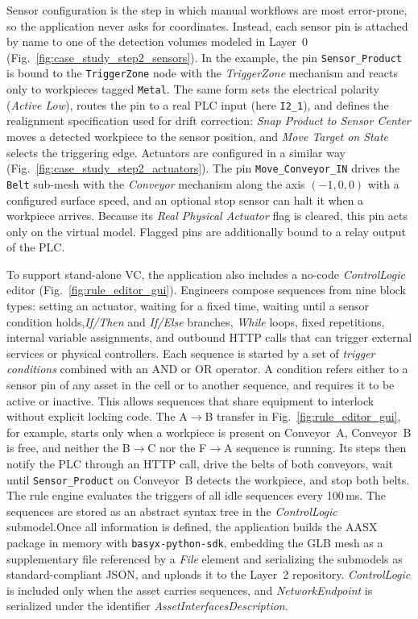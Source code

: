 \documentclass{ieeeojies}
\begin{document}
Sensor configuration is the step in which manual workflows are most error-prone, so the application never asks for coordinates. Instead, each sensor pin is attached by name to one of the detection volumes modeled in Layer~0 (Fig.~\ref{fig:case_study_step2_sensors}). In the example, the pin \texttt{Sensor\_Product} is bound to the \texttt{TriggerZone} node with the \textit{TriggerZone} mechanism and reacts only to workpieces tagged \texttt{Metal}. The same form sets the electrical polarity (\textit{Active Low}), routes the pin to a real PLC input (here \texttt{I2\_1}), and defines the realignment specification used for drift correction: \textit{Snap Product to Sensor Center} moves a detected workpiece to the sensor position, and \textit{Move Target on State} selects the triggering edge. Actuators are configured in a similar way (Fig.~\ref{fig:case_study_step2_actuators}). The pin \texttt{Move\_Conveyor\_IN} drives the \texttt{Belt} sub-mesh with the \textit{Conveyor} mechanism along the axis $(-1, 0, 0)$ with a configured surface speed, and an optional stop sensor can halt it when a workpiece arrives. Because its \textit{Real Physical Actuator} flag is cleared, this pin acts only on the virtual model. Flagged pins are additionally bound to a relay output of the PLC.

To support stand-alone VC, the application also includes a no-code \textit{ControlLogic} editor (Fig.~\ref{fig:rule_editor_gui}). Engineers compose sequences from nine block types: setting an actuator, waiting for a fixed time, waiting until a sensor condition holds,\textit{If/Then} and \textit{If/Else} branches, \textit{While} loops, fixed repetitions, internal variable assignments, and outbound HTTP calls that can trigger external services or physical controllers. Each sequence is started by a set of \textit{trigger conditions} combined with an AND or OR operator. A condition refers either to a sensor pin of any asset in the cell or to another sequence, and requires it to be active or inactive. This allows sequences that share equipment to interlock without explicit locking code. The A$\rightarrow$B transfer in Fig.~\ref{fig:rule_editor_gui}, for example, starts only when a workpiece is present on Conveyor~A, Conveyor~B is free, and neither the B$\rightarrow$C nor the F$\rightarrow$A sequence is running. Its steps then notify the PLC through an HTTP call, drive the belts of both conveyors, wait until \texttt{Sensor\_Product} on Conveyor~B detects the workpiece, and stop both belts. The rule engine evaluates the triggers of all idle sequences every 100\,ms. The sequences are stored as an abstract syntax tree in the \textit{ControlLogic} submodel.Once all information is defined, the application builds the AASX package in memory with \texttt{basyx-python-sdk}, embedding the GLB mesh as a supplementary file referenced by a \textit{File} element and serializing the submodels as standard-compliant JSON, and uploads it to the Layer~2 repository. \textit{ControlLogic} is included only when the asset carries sequences, and \textit{NetworkEndpoint} is serialized under the identifier \textit{AssetInterfacesDescription}.
\end{document}

